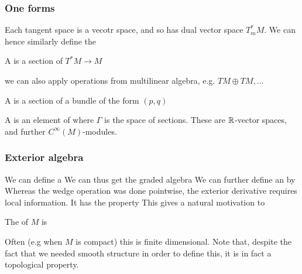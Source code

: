 \documentclass{article}
\begin{document}

\subsubsection{One forms}
Each tangent space is a vecotr space, and so has dual vector space $T_m^\ast M$. We can hence similarly define the  

\begin{definition}
A  is a section of $T^\ast M \to M$
\end{definition}
we can also apply operations from multilinear algebra, e.g. $TM \oplus TM, \dots$

\begin{definition}
A  is a section of a bundle of the form $(p,q)$
\end{definition}

\begin{definition}
A  is an element of 
where $\Gamma$ is the space of sections. These are $\mathbb{R}$-vector spaces, and further $C^\infty(M)$-modules. 
\end{definition}

\subsubsection{Exterior algebra}
We can define a  
We can thus get the graded algebra 
We can further define an  by 
Whereas the wedge operation was done pointwise, the exterior derivative requires local information. It has the property
This gives a natural motivation to 
\begin{definition}
The  of $M$ is 
\end{definition}
Often (e.g when $M$ is compact) this is finite dimensional. Note that, despite the fact that we needed smooth structure in order to define this, it is in fact a topological property. 
\end{document}
